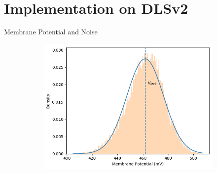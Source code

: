 \documentclass[12pt, aspectratio=169]{beamer}
\begin{document}
\section[Implementation on DLSv2]{Implementation on DLSv2}
\begin{frame}{Membrane Potential and Noise}
    \begin{figure}[!htb]    	
        \centering
            \begin{figure}
               \scalebox{1.75}{}
                \label{neural network}
            \end{figure}
      	\endminipage\hfill
        	\vspace{20pt}
      	    \centering
            \begin{figure}
                \includegraphics[scale=0.5]{mfp/activation_function_vmem_distr.png}
                \label{membrane_potential}
            \end{figure}
        \endminipage\hfill
    \end{figure}
\end{frame}
\end{document}
